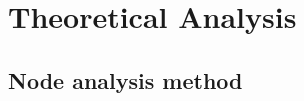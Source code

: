 \section{Theoretical Analysis}
\label{sec:analysis}

\subsection{Node analysis method}
\label{sec:node}

